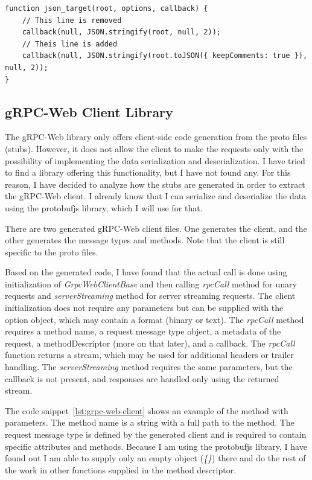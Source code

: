 \begin{lstlisting}[style=JavaScript, caption={protobufjs-cli comments support}, label={lst:protobufjs-comments}]
function json_target(root, options, callback) {
    // This line is removed
    callback(null, JSON.stringify(root, null, 2));
    // Theis line is added
    callback(null, JSON.stringify(root.toJSON({ keepComments: true }), null, 2));
}
\end{lstlisting}

\subsection{gRPC-Web Client Library}\label{subsec:grpc-web-client}
The gRPC-Web library only offers client-side code generation from the proto files (stubs).
However, it does not allow the client to make the requests only with the possibility of implementing the data serialization and deserialization.
I have tried to find a library offering this functionality, but I have not found any.
For this reason, I have decided to analyze how the stubs are generated in order to extract the gRPC-Web client.
I already know that I can serialize and deserialize the data using the protobufjs library, which I will use for that.

There are two generated gRPC-Web client files.
One generates the client, and the other generates the message types and methods.
Note that the client is still specific to the proto files.

Based on the generated code, I have found that the actual call is done using initialization of \textit{GrpcWebClientBase} and then calling \textit{rpcCall} method for unary requests and \textit{serverStreaming} method for server streaming requests.
The client initialization does not require any parameters but can be supplied with the option object, which may contain a format (binary or text).
The \textit{rpcCall} method requires a method name, a request message type object, a metadata of the request, a methodDescriptor (more on that later), and a callback.
The \textit{rpcCall} function returns a stream, which may be used for additional headers or trailer handling.
The \textit{serverStreaming} method requires the same parameters, but the callback is not present, and responses are handled only using the returned stream.

The code snippet~\ref{lst:grpc-web-client} shows an example of the method with parameters.
The method name is a string with a full path to the method.
The request message type is defined by the generated client and is required to contain specific attributes and methods.
Because I am using the protobufjs library, I have found out I am able to supply only an empty object (\textit{\{\}}) there and do the rest of the work in other functions supplied in the method descriptor.

